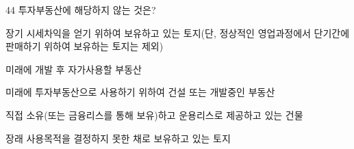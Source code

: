 \begin{question}{44}
투자부동산에 해당하지 않는 것은?
\begin{choices}
  \item 장기 시세차익을 얻기 위하여 보유하고 있는 토지(단, 정상적인 영업과정에서 단기간에 판매하기 위하여 보유하는 토지는 제외)
  \item 미래에 개발 후 자가사용할 부동산
  \item 미래에 투자부동산으로 사용하기 위하여 건설 또는 개발중인 부동산
  \item 직접 소유(또는 금융리스를 통해 보유)하고 운용리스로 제공하고 있는 건물
  \item 장래 사용목적을 결정하지 못한 채로 보유하고 있는 토지
\end{choices}
\end{question}
